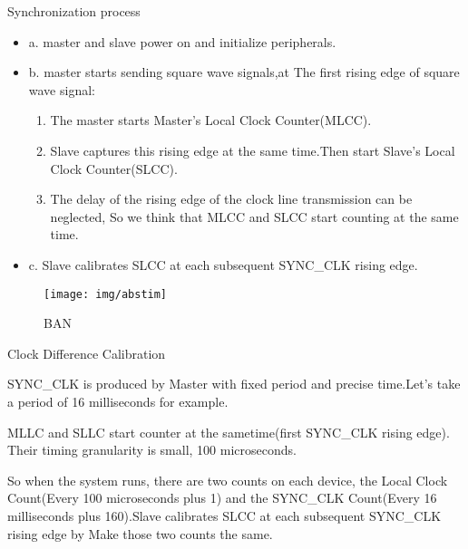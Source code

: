 \begin{frame}[fragile]{Synchronization process}

\begin{itemize}
\item a. master and slave power on and initialize peripherals.
\item b. master starts sending square wave signals,at The first rising edge of
square wave signal:
  \begin{enumerate}
    \item  The master starts Master's Local Clock Counter(MLCC).
    \item Slave captures this rising edge at the same time.Then start Slave's Local Clock Counter(SLCC).
    \item The delay of the rising edge of the clock line transmission can be neglected, So we think that MLCC and SLCC start counting at the same time.
  \end{enumerate}
 \item c. Slave calibrates SLCC at each subsequent SYNC\_CLK rising edge.

\end{itemize}



\begin{figure}[htbp]
\begin{center}
\texttt{[image: img/abstim]}
\caption{BAN }
\label{Overview}
\end{center}
\vspace{-0.5em}
\end{figure}
\end{frame}





\begin{frame}[fragile]{Clock Difference Calibration}

SYNC\_CLK is produced by Master with fixed period and precise time.Let's take a period of 16 milliseconds for example.

MLLC and SLLC start counter at the sametime(first SYNC\_CLK rising edge). Their timing granularity is small, 100 microseconds.

So when the system runs, there are two counts on each device, the Local Clock Count(Every 100 microseconds plus 1) and the SYNC\_CLK Count(Every 16 milliseconds plus 160).Slave calibrates SLCC at each subsequent SYNC\_CLK rising edge by Make those two counts the same.



\end{frame}




